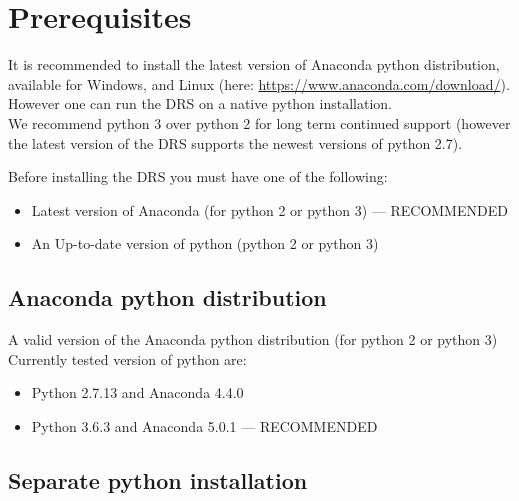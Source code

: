 \clearpage
\newpage
\section{Prerequisites}
\label{ch:install:prerequisites}

It is recommended to install the latest version of Anaconda python distribution, available for Windows, \mac and Linux (here: \url{https://www.anaconda.com/download/}). However one can run the DRS on a native python installation. \\

\noindent We recommend python 3 over python 2 for long term continued support (however the latest version of the DRS supports the newest versions of python 2.7).

\begin{note}
Before installing the DRS you must have one of the following:
\begin{itemize}
\item Latest version of Anaconda (for python 2 or python 3) --- RECOMMENDED
\item An Up-to-date version of python (python 2 or python 3)
\end{itemize}
\end{note}


\subsection{Anaconda python distribution}
\label{ch:install:prerequisites:anaconda}

A valid version of the Anaconda python distribution (for python 2 or python 3)
\noindent Currently tested version of python are:
\begin{itemize}
\item Python 2.7.13 and Anaconda 4.4.0
\item Python 3.6.3 and Anaconda 5.0.1 --- RECOMMENDED
\end{itemize}



\subsection{Separate python installation}
\label{ch:install:prerequisites:separate_python}

